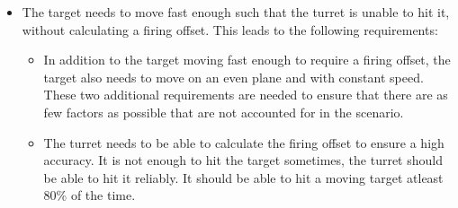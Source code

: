 \begin{itemize}
\begin{itemize}
  \end{itemize}  
  \item The target needs to move fast enough such that the turret is unable to
  hit it, without calculating a firing offset. This leads to the following
  requirements:
  \begin{itemize}
    \item In addition to the target moving fast enough to require a firing
    offset, the target also needs to move on an even plane and with constant
    speed. These two additional requirements are needed to ensure that there are
    as few factors as possible that are not accounted for in the scenario.
    \item The turret needs to be able to calculate the firing offset to ensure
    a high accuracy. It is not enough to hit the target sometimes, the turret
    should be able to hit it reliably. It should be able to hit a moving target
    atleast 80\% of the time.
  
  \end{itemize}
  \end{itemize}
